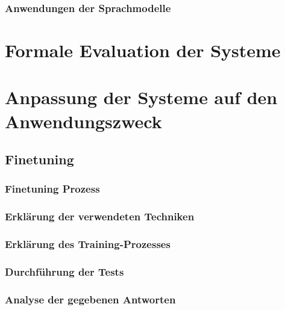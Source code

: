 \documentclass[german,report]{i1thesis}
\begin{document}
\subsubsection{Anwendungen der Sprachmodelle}



\section{Formale Evaluation der Systeme}%
\label{sec:formale-evaluation}




\section{Anpassung der Systeme auf den Anwendungszweck}%
\label{sec:anpassungen-systeme}
\subsection{Finetuning}%
\label{subsec:Finetuning-cloud}




\subsubsection{Finetuning Prozess}%
\label{subsec:Finetuning-prozess}



\subsubsection{Erklärung der verwendeten Techniken}%



\subsubsection{Erklärung des Training-Prozesses}%
\label{subsec:training-prozess}



\subsubsection{Durchführung der Tests}%
\label{subsec:durchfuehrung-der-tests}

\subsubsection{Analyse der gegebenen Antworten}%
\label{subsec:Analyse der gegebenen Antworten}
\end{document}
